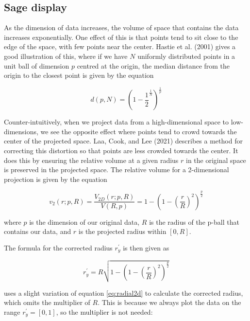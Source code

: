 \hypertarget{sage-display}{%
\subsection{Sage display}\label{sage-display}}

As the dimension of data increases, the volume of space that contains the data increases exponentially. One effect of this is that points tend to sit close to the edge of the space, with few points near the center. Hastie et al. (2001) gives a good illustration of this, where if we have \(N\) uniformly distributed points in a unit ball of dimension \(p\) centred at the origin, the median distance from the origin to the closest point is given by the equation

\begin{equation}
d(p, N) = \left( 1- \frac{1}{2}^\frac{1}{N}\right)^\frac{1}{p}
\end{equation}

Counter-intuitively, when we project data from a high-dimensional space to low-dimensions, we see the opposite effect where points tend to crowd towards the center of the projected space. Laa, Cook, and Lee (2021) describes a method for correcting this distortion so that points are less crowded towards the center. It does this by ensuring the relative volume at a given radius \(r\) in the original space is preserved in the projected space. The relative volume for a 2-dimensional projection is given by the equation

\begin{equation}
v_2(r; p, R) 
= \frac{V_{2D}(r; p, R)}{V(R,p)}
= 1 - \left(1-\left(\frac{r}{R}\right)^2\right)^\frac{p}{2}
\label{eq:radialcdf2d}
\end{equation}

where \(p\) is the dimension of our original data, \(R\) is the radius of the p-ball that contains our data, and \(r\) is the projected radius within \([0, R]\).

The formula for the corrected radius \(r_y^\prime\) is then given as

\begin{equation}
r_y^\prime = R \sqrt{1 - \left(1-\left(\frac{r}{R}\right)^2\right)^\frac{p}{2}}
\label{eq:radial2d}
\end{equation}

 uses a slight variation of equation \eqref{eq:radial2d} to calculate the corrected radius, which omits the multiplier of \(R\). This is because we always plot the data on the range \(r_y^\prime = [0, 1]\), so the multiplier is not needed:

